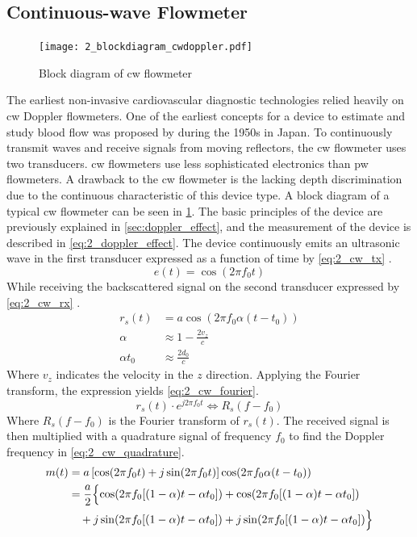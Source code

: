\subsection{Continuous-wave Flowmeter}
\begin{figure}[htbp]
	\centering
	\texttt{[image: 2\_blockdiagram\_cwdoppler.pdf]}
	\caption[Block diagram of continuous-wave flowmeter]{Block diagram of \gls{cw} flowmeter \cite{JensenUltrasoundBook}}
	\label{fig:2_devices_cw}
\end{figure}
The earliest non-invasive cardiovascular diagnostic technologies relied heavily on \gls{cw} Doppler flowmeters. One of the earliest concepts for a device to estimate and study blood flow was proposed by \cite{Satomura_CW} during the 1950s in Japan. To continuously transmit waves and receive signals from moving reflectors, the \gls{cw} flowmeter uses two transducers. \gls{cw} flowmeters use less sophisticated electronics than \gls{pw} flowmeters. A drawback to the \gls{cw} flowmeter is the lacking depth discrimination due to the continuous characteristic of this device type. A block diagram of a typical \gls{cw} flowmeter can be seen in \cref{fig:2_devices_cw}. The basic principles of the device are previously explained in \cref{sec:doppler_effect}, and the measurement of the device is described in \cref{eq:2_doppler_effect}. The device continuously emits an ultrasonic wave in the first transducer expressed as a function of time by \cref{eq:2_cw_tx} \cite{JensenUltrasoundBook}.
\begin{equation} \label{eq:2_cw_tx}
	e(t) = \cos (2\pi f_{0} t)
\end{equation}
While receiving the backscattered signal on the second transducer expressed by \cref{eq:2_cw_rx} \cite{JensenUltrasoundBook}.
\begin{align} \label{eq:2_cw_rx}
	r_{s}(t) &= a \cos \left( 2\pi f_{0} \alpha (t-t_{0}) \right) \\
	\alpha &\approx 1 - \frac{2 v_{z}}{c} \\
	\alpha t_{0} &\approx \frac{2 d_{0}}{c}
\end{align}
Where $v_{z}$ indicates the velocity in the $z$ direction. Applying the Fourier transform, the expression yields \cref{eq:2_cw_fourier}.
\begin{equation} \label{eq:2_cw_fourier}
	r_{s}(t)\cdot e^{j2\pi f_{0} t} \Longleftrightarrow R_{s}(f-f_{0})
\end{equation}
Where $R_{s}(f-f_{0})$ is the Fourier transform of $r_{s}(t)$. The received signal is then multiplied with a quadrature signal of frequency $f_{0}$ to find the Doppler frequency in \cref{eq:2_cw_quadrature}.
\begin{align} \label{eq:2_cw_quadrature}
	m(t) &= a \left[ \cos(2\pi f_{0} t) + j\sin (2\pi f_{0} t) \right] \cos (2\pi f_{0} \alpha (t-t_{0})) \\
	&= \frac{a}{2} \Bigl\{ \cos (2\pi f_{0} [ (1-\alpha) t- \alpha t_{0} ]) + \cos (2\pi f_{0} [ (1-\alpha) t- \alpha t_{0} ]) \\
	&\quad + j \sin (2\pi f_{0} [ (1-\alpha) t- \alpha t_{0} ]) + j \sin (2\pi f_{0} [(1-\alpha) t- \alpha t_{0} ]) \Bigr\} \nonumber
\end{align}

